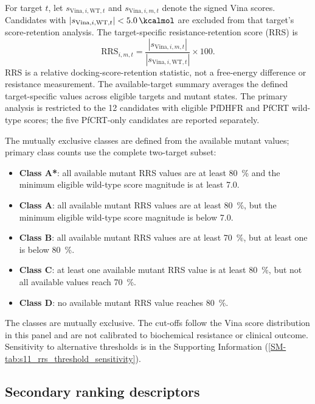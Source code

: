 \documentclass[journal=jcisd8,manuscript=article,layout=traditional]{achemso}
\begin{document}
For target $t$, let $s_{\mathrm{Vina},i,\mathrm{WT},t}$ and $s_{\mathrm{Vina},i,m,t}$ denote the signed Vina scores. Candidates with $|s_{\mathrm{Vina},i,\mathrm{WT},t}| < \qty{5.0}{\kcalmol}$ are excluded from that target's score-retention analysis. The target-specific resistance-retention score (RRS) is
\begin{equation}
\mathrm{RRS}_{i,m,t} = \frac{|s_{\mathrm{Vina},i,m,t}|}{|s_{\mathrm{Vina},i,\mathrm{WT},t}|} \times 100.
\end{equation}
RRS is a relative docking-score-retention statistic, not a free-energy difference or resistance measurement. The available-target summary averages the defined target-specific values across eligible targets and mutant states. The primary analysis is restricted to the 12 candidates with eligible PfDHFR and PfCRT wild-type scores; the five PfCRT-only candidates are reported separately.

The mutually exclusive classes are defined from the available mutant values; primary class counts use the complete two-target subset:
\begin{itemize}
    \item \textbf{Class A*}: all available mutant RRS values are at least \qty{80}{\percent} and the minimum eligible wild-type score magnitude is at least \qty{7.0}{\kcalmol}.
    \item \textbf{Class A}: all available mutant RRS values are at least \qty{80}{\percent}, but the minimum eligible wild-type score magnitude is below \qty{7.0}{\kcalmol}.
    \item \textbf{Class B}: all available mutant RRS values are at least \qty{70}{\percent}, but at least one is below \qty{80}{\percent}.
    \item \textbf{Class C}: at least one available mutant RRS value is at least \qty{80}{\percent}, but not all available values reach \qty{70}{\percent}.
    \item \textbf{Class D}: no available mutant RRS value reaches \qty{80}{\percent}.
\end{itemize}
The classes are mutually exclusive. The cut-offs follow the Vina score distribution in this panel and are not calibrated to biochemical resistance or clinical outcome. Sensitivity to alternative thresholds is in the Supporting Information (\cref{SM-tab:s11_rrs_threshold_sensitivity}).

\subsection{Secondary ranking descriptors}
\end{document}
